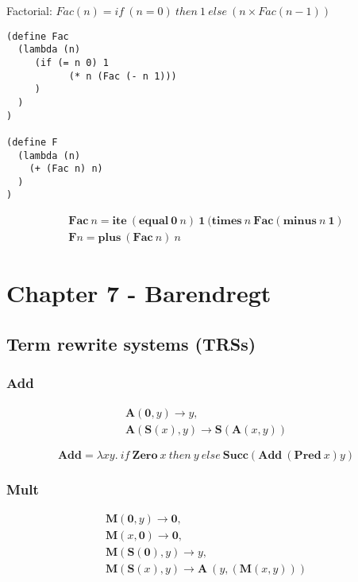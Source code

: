 \documentclass[11pt]{article}
\begin{document}
Factorial: $Fac(n) = if\ (n = 0)\ then\ 1\ else\ (n \times Fac(n-1))$

\clearpage

\begin{verbatim}
(define Fac
  (lambda (n)
     (if (= n 0) 1
           (* n (Fac (- n 1)))
     )
  )
)

(define F
  (lambda (n)
    (+ (Fac n) n)
  )
)
\end{verbatim}

\begin{gather*}
\mathbf{Fac}\ n = \mathbf{ite}\ (\mathbf{equal}\ \mathbf{0}\ n)\ \mathbf{1}\ (\mathbf{times}\ n\ \mathbf{Fac}(\mathbf{minus}\ n\ \mathbf{1}) \\
\mathbf{F}n = \mathbf{plus}\ (\mathbf{Fac}\ n)\ n
\end{gather*}




\section*{Chapter 7 - Barendregt}
\subsection*{Term rewrite systems (TRSs)}
\subsubsection*{Add}

\begin{gather*}
\mathbf{A}(\mathbf{0}, y) \rightarrow y, \\
\mathbf{A}(\mathbf{S}(x), y) \rightarrow \mathbf{S}(\mathbf{A}(x, y))
\end{gather*}

\[
\mathbf{Add} = \lambda xy.\ if\ \mathbf{Zero}\ x\ then\ y\ else\ \mathbf{Succ}(\mathbf{Add}\ (\mathbf{Pred}\ x)y)
\]

\clearpage

\subsubsection*{Mult}

\begin{gather*}
\mathbf{M}(\mathbf{0}, y) \rightarrow \mathbf{0}, \\
\mathbf{M}(x, \mathbf{0}) \rightarrow \mathbf{0}, \\
\mathbf{M}(\mathbf{S}(\mathbf{0}), y) \rightarrow y, \\ 
\mathbf{M}(\mathbf{S}(x), y) \rightarrow \mathbf{A}\ (y, (\mathbf{M} (x, y)))
\end{gather*}
\end{document}

